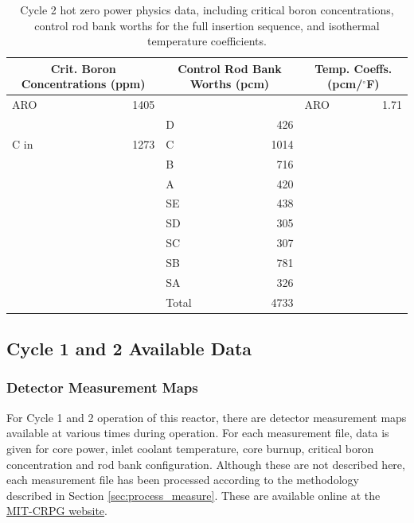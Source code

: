 \begin{table}[htp]
  \centering
  \caption[Cycle 2 hot zero power physics data.]{Cycle 2 hot zero power physics
  data, including critical boron concentrations, control rod bank worths for the
  full insertion sequence, and isothermal temperature coefficients.
  \label{tbl:meas_c2phys}}
  \begin{tabular}{l r l r l r}
    \toprule 
    \multicolumn{2}{c}{Crit. Boron Concentrations (\acs{ppm})} &
    \multicolumn{2}{c}{Control Rod Bank Worths (\acs{pcm})} &
    \multicolumn{2}{c}{Temp. Coeffs. (\acs{pcm}/$^\circ$F)}\\
    \midrule
    \midrule
	
    \ac{ARO} & 1405 &       &       & \ac{ARO} &  1.71 \\
             &      & D     & 426   &          &       \\
    C in     & 1273 & C     & 1014  &          &       \\
             &      & B     & 716   &          &       \\
             &      & A     & 420   &          &       \\
             &      & SE    & 438   &          &       \\
             &      & SD    & 305   &          &       \\
             &      & SC    & 307   &          &       \\
             &      & SB    & 781   &          &       \\
             &      & SA    & 326   &          &       \\
             &      & Total & 4733  &          &       \\
    
    \bottomrule
  \end{tabular}
\end{table}

\subsection{Cycle 1 and 2 Available Data}
\label{sec:available_data}

\subsubsection{Detector Measurement Maps}
\label{sec:measurement_maps}
For Cycle 1 and 2 operation of this reactor, there are detector measurement maps
available at various times during operation. For each measurement file, data is
given for core power, inlet coolant temperature, core burnup, critical boron
concentration and rod bank configuration.
Although these are not described here, each measurement file has been processed
according to the methodology described in Section \ref{sec:process_measure}.
These are available online at the
{\color{blue}\href{http://crpg.mit.edu/pub/beavrs}{MIT-CRPG website}}.

